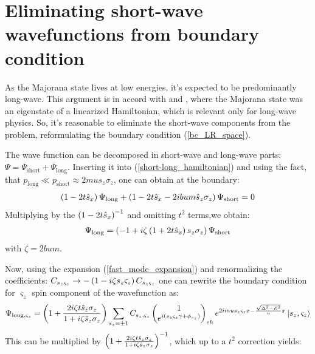 \section{Eliminating short-wave wavefunctions from boundary condition}
\label{sec:elimintaing_long-wave}


	As the Majorana state lives at low energies, it's expected to be predominantly long-wave. This argument is in accord with \cite{Oreg_2010} and \cite{Lutchyn_2010}, where the Majorana state was an eigenstate of a linearized Hamiltonian, which is relevant only for long-wave physics. So, it's reasonable to eliminate the short-wave components from the problem, reformulating the boundary condition (\ref{bc_LR_space}).

The wave function can be decomposed in short-wave and  long-wave  parts: $ \Psi = \Psi_{\mathrm{short}}+\Psi_{\mathrm{long}} $. Inserting it into (\ref{short-long_hamiltonian}) and using the fact, that $ p_{\mathrm{
long}}\ll p_{\mathrm{short}} \approx 2mu s_z \sigma_z $, one can obtain at the boundary:
\begin{gather}
	\left(1-2t\hat{s}_x\right)\Psi_{\mathrm{long}}+\left(1-2t\hat{s}_x-2ibum\hat{s}_z \sigma_z\right)\Psi_{\mathrm{short}}=0
\end{gather}
Multiplying by the $ \left(1-2t\hat{s}_x\right)^{-1} $ and omitting $ {t^2} $ terms,we obtain:
\begin{gather}
	\Psi_{\mathrm{long}}
	=
	\left(-1+i\zeta\left(1+2t\hat{s}_x\right)s_z \sigma_z\right)\Psi_{\mathrm{short}}
\end{gather}
with $ \zeta=2bum $.

Now, using the expansion (\ref{fast_mode_expansion}) and renormalizing the coefficients: $ C_{s_z \varsigma_z}\to-\left(1-i\zeta s_z \varsigma_z\right)C_{s_z \varsigma_z} $ one can rewrite the boundary condition for $ \varsigma_z $ spin component of the wavefunction as:
\begin{gather}
\Psi_{\mathrm{long},\varsigma_z}
=
\left(1+\frac{2i\zeta t\hat{s}_z\sigma_z}{1+i\zeta \hat{s}_z\sigma_z}\right)
\sum_{s_z=\pm1}
C_{s_z,\varsigma_z}
		\begin{pmatrix}
	1
	\\
	e^{i\left(s_z\varsigma_z\gamma+\phi_{s_z}\right)}
	\end{pmatrix}_{eh}
	e^{2imus_z\varsigma_zx -\frac{\sqrt{\Delta^2-E^2}}{u}x}
	\ket{s_z, \varsigma_z}
\end{gather}
This can be  multiplied by $ \left(1+\frac{2i\zeta t\hat{s}_z\sigma_z}{1+i\zeta \hat{s}_z\sigma_z}\right)^{-1} $, which up to a $ t^2 $ correction yields:

